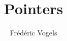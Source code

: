 

\usetikzlibrary{shadows,shapes.multipart}

\title{Pointers}
\author{Fr\'ed\'eric Vogels}




\begin{frame}
  \titlepage
\end{frame}











